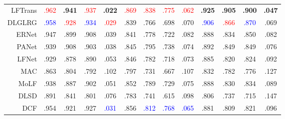 \begin{table}[p]
{\begin{tabular}{rcccccccccccc}
			LFTrans \upcite{liu2023lftransnet}
			& \textcolor{red}{.962} & \textbf{.941} & \textcolor{red}{.937} & \textbf{.022}
			& \textcolor{red}{.869} & \textcolor{red}{.838} & \textcolor{red}{.775} & \textcolor{red}{.062}
			& \textbf{.925} & \textbf{.905} & \textbf{.900} & \textbf{.047}
			\\
			
			DLGLRG \upcite{liu2021light} 
			& \textcolor{blue}{.958} & {\textcolor{red}{.928}} 			& {\textcolor{blue}{.934}} & {\textcolor{red}{.029}} 
			&	.839 &	.766 &	.698 &	.070 
			& \textcolor{blue}{.906} &	\textcolor{red}{.866} &	\textcolor{blue}{.870} &	.069
			\\
			
			ERNet \upcite{piao2020exploit}
			& .947 & .899 & .908 & .039 
			&	.841 &	.778 &	.722 &	.082 
			&	.888 &	.834 &	.850 &	.082 
			\\
			
			PANet \upcite{piao2021panet} 
			& .939 & .908 & .903 & .038 
			& .845 & .795 & .738 & .074 
			& .892 & .849 & .849 & .076
			\\
			
			LFNet	 \upcite{zhang2020lfnet} 
			& .929 & .878 & .890 & .053
			&	.846 &	.782 &	.718 &	.073 
			&	.885 &	.820 &	.824 &	.092 \\
			
			MAC	 \upcite{zhang2020light} 
			& .863	& .804	& .792	& .102	
			&   .797 & .731 & .667 & .107 
			& .832 & .782 & .776 & .127 \\
			
			MoLF	 \upcite{zhang2019memory} 
			& .938 & .887 & .902 & .051 
			&	.852 &	.789 &	.729 &	.075 
			&	.888 &	.830 &	.834 &	.089 \\
			
			DLSD	\upcite{piao2019deep}
			& .891	& .841	& .801	& .076	
			&   .783 & .741 & .615 & .098 
			& .806 & .737 & .715 & .147 \\
			
			\midrule %
			
			
			DCF \upcite{ji2021calibrated} 
			
			& .954 & .921 & .927 & \textcolor{blue}{.031}
			& .856 & \textcolor{blue}{.812} & \textcolor{blue}{.768} & \textcolor{blue}{.065}
			& .881 & .809 & .821 & .096 \\
			

\end{tabular}}
\end{table}
